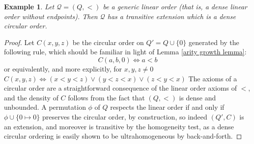 \documentclass{amsart}
\newtheorem{definition}[theorem]{Definition}
\newtheorem{example}[theorem]{Example}
\newcommand{\set}[1]{\{#1 \}}
\begin{document}
\begin{example}
    Let $\mathcal{Q} = (Q, <)$ be a generic linear order (that is, a dense linear order without endpoints). Then $\mathcal{Q}$ has a transitive extension which is a dense circular order.
\end{example}
\begin{proof}
    Let $C(x,y,z)$ be the circular order on $Q' = Q \cup \set{0}$ generated by the following rule, which should be familiar in light of Lemma \ref{arity growth lemma}:
    $$C(a, b, 0) \Longleftrightarrow a<b$$
    or equivalently, and more explicitly, for $x,y,z\neq 0$
    $C(x,y,z) \Longleftrightarrow (x<y<z) \vee (y<z<x) \vee (z<y<x)$
    The axioms of a circular order are a straightforward consequence of the linear order axioms of $<$, and the density of $C$ follows from the fact that $(Q, <)$ is dense and unbounded. A permutation $\phi$ of $Q$ respects the linear order if and only if $\phi \cup\set{0 \mapsto 0}$ preserves the circular order, by construction, so indeed $(Q', C)$ is an extension, and moreover is transitive by the homogeneity test, as a dense circular ordering is easily shown to be ultrahomogeneous by back-and-forth.
\end{proof}





\end{document}
